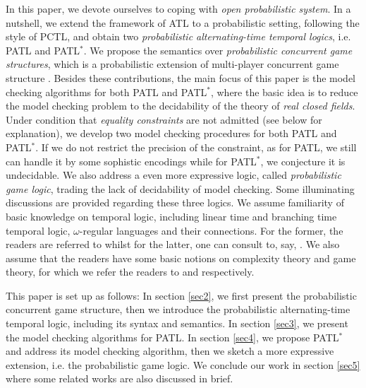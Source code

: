 \documentclass[times, 10 pt,twocolumn]{article}
\begin{document}
In this paper, we devote ourselves to coping with \emph{open
probabilistic system}. In a nutshell, we extend the framework of
ATL to a probabilistic setting, following the style of PCTL, and
obtain two \emph{probabilistic alternating-time temporal logics},
i.e. PATL and PATL$^*$. We propose the semantics over
\emph{probabilistic concurrent game structures}, which is a
probabilistic extension of multi-player concurrent game structure
\cite{AHK02}. Besides these contributions, the main focus of this
paper is the model checking algorithms for both PATL and PATL$^*$,
where the basic idea is to reduce the model checking problem to
the decidability of the theory of \emph{real closed fields}. %
Under condition that \emph{equality constraints} are not admitted
(see below for explanation), we develop two model checking
procedures for both PATL and PATL$^*$. If we do not restrict the
precision of the constraint, %
as for PATL, we still can handle it by some sophistic encodings
while for PATL$^*$, we conjecture it is undecidable. We also
address a even more expressive logic, called \emph{probabilistic
game logic}, trading the lack of decidability of model checking.
Some illuminating discussions are provided regarding these three
logics. We assume %
familiarity of basic knowledge on temporal logic, including linear
time and branching time temporal logic, $\omega$-regular languages
and their connections. For the former, the readers are referred to
\cite{CGP00} whilst for the latter, one can consult to, say,
\cite{Tho97}. We also assume that the readers have some basic
notions on complexity theory and game theory, for which we refer
the readers to \cite{Pap94} and \cite{Owe95} respectively.


This paper is set up as follows: In section \ref{sec2}, we first
present the probabilistic concurrent game structure, %
then we introduce the probabilistic alternating-time temporal
logic, including its syntax and semantics. In section \ref{sec3},
we present the model checking algorithms for PATL. In section
\ref{sec4}, we propose PATL$^*$ and address its model checking
algorithm, then we sketch a more expressive extension, i.e. the
probabilistic game logic. %
We conclude our work in section \ref{sec5} where some related
works are also discussed in brief.
\end{document}
